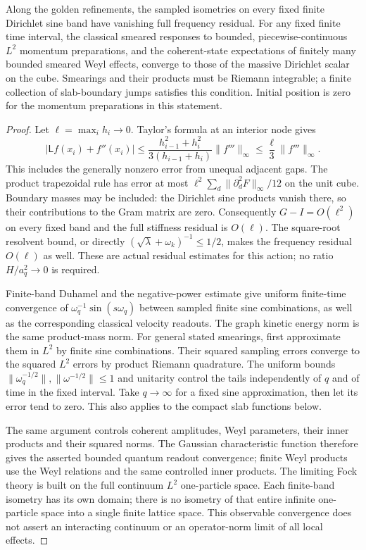 \begin{proposition}
\label{prop:common-scalar-continuum-limit}
Along the golden refinements, the sampled isometries on every fixed finite
Dirichlet sine band have vanishing full frequency residual. For any fixed
finite time interval, the classical smeared responses to bounded,
piecewise-continuous $L^2$ momentum preparations, and the coherent-state
expectations of finitely many bounded smeared Weyl effects, converge to
those of the massive Dirichlet scalar on the cube. Smearings and their
products must be Riemann integrable; a finite collection of slab-boundary
jumps satisfies this condition. Initial position is zero for the momentum
preparations in this statement.
\end{proposition}
\begin{proof}
Let $\ell=\max_i h_i\to0$. Taylor's formula at an interior node gives
\[
 |\mathsf Lf(x_i)+f''(x_i)|\le
 \frac{h_{i-1}^2+h_i^2}{3(h_{i-1}+h_i)}\|f'''\|_\infty
 \le\frac\ell3\|f'''\|_\infty.
\]
This includes the generally nonzero error from unequal adjacent gaps.
The product trapezoidal rule has error at most
$\ell^2\sum_d\|\partial_d^2F\|_\infty/12$ on the unit cube.
Boundary masses may be included: the Dirichlet sine products vanish there,
so their contributions to the Gram matrix are zero.
Consequently $G-I=O(\ell^2)$ on every fixed band and the full stiffness
residual is $O(\ell)$. The square-root resolvent bound, or directly
$(\sqrt\lambda+\omega_k)^{-1}\le1/2$, makes the frequency residual
$O(\ell)$ as well. These are actual residual estimates for this action;
no ratio $H/a_q^2\to0$ is required.

Finite-band Duhamel and the negative-power estimate give uniform finite-time
convergence of $\omega_q^{-1}\sin(s\omega_q)$ between sampled finite
sine combinations, as well as the corresponding classical velocity
readouts. The graph kinetic energy norm is the same product-mass norm.
For general stated smearings, first approximate them in $L^2$ by finite
sine combinations. Their squared sampling errors converge to the squared
$L^2$ errors by product Riemann quadrature. The uniform bounds
$\|\omega_q^{-1/2}\|,\|\omega^{-1/2}\|\le1$ and unitarity control
the tails independently of $q$ and of time in the fixed interval. Take
$q\to\infty$ for a fixed sine approximation, then let its error tend to
zero. This also applies to the compact slab functions below.

The same argument controls coherent amplitudes, Weyl parameters, their
inner products and their squared norms. The Gaussian characteristic
function therefore gives the asserted bounded quantum readout convergence;
finite Weyl products use the Weyl relations and the same controlled inner
products. The limiting Fock theory is built on the full continuum
$L^2$ one-particle space. Each finite-band isometry has its own domain;
there is no isometry of that entire infinite one-particle space into a
single finite lattice space. This observable convergence does not assert
an interacting continuum or an operator-norm limit of all local effects.
\end{proof}

